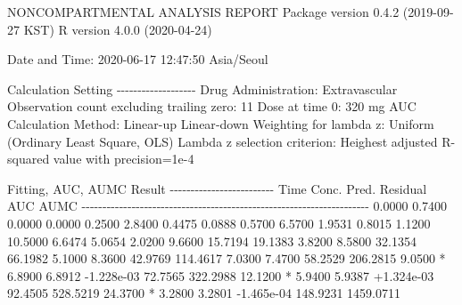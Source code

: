 \documentclass[
  12pt,
]{krantz}
\newenvironment{Shaded}{\begin{snugshade}}{\end{snugshade}}
\newcommand{\ExtensionTok}[1]{#1}
\newcommand{\NormalTok}[1]{#1}
\begin{document}
\begin{Shaded}
\begin{Highlighting}[]
                        \ExtensionTok{NONCOMPARTMENTAL}\NormalTok{ ANALYSIS REPORT}
                       \ExtensionTok{Package}\NormalTok{ version 0.4.2 (2019{-}09{-}27 KST)}
                          \ExtensionTok{R}\NormalTok{ version 4.0.0 (2020{-}04{-}24)}

\ExtensionTok{Date}\NormalTok{ and Time: 2020{-}06{-}17 12:47:50 Asia/Seoul}

\ExtensionTok{Calculation}\NormalTok{ Setting}
\ExtensionTok{{-}{-}{-}{-}{-}{-}{-}{-}{-}{-}{-}{-}{-}{-}{-}{-}{-}{-}{-}}
\ExtensionTok{Drug}\NormalTok{ Administration: Extravascular}
\ExtensionTok{Observation}\NormalTok{ count excluding trailing zero: 11}
\ExtensionTok{Dose}\NormalTok{ at time 0: 320 mg}
\ExtensionTok{AUC}\NormalTok{ Calculation Method: Linear{-}up Linear{-}down}
\ExtensionTok{Weighting}\NormalTok{ for lambda z: Uniform (Ordinary Least Square, OLS)}
\ExtensionTok{Lambda}\NormalTok{ z selection criterion: Heighest adjusted R{-}squared value with precision=1e{-}4}


\ExtensionTok{Fitting}\NormalTok{, AUC, AUMC Result}
\ExtensionTok{{-}{-}{-}{-}{-}{-}{-}{-}{-}{-}{-}{-}{-}{-}{-}{-}{-}{-}{-}{-}{-}{-}{-}{-}{-}}
      \ExtensionTok{Time}\NormalTok{         Conc.      Pred.   Residual       AUC       AUMC}
\ExtensionTok{{-}{-}{-}{-}{-}{-}{-}{-}{-}{-}{-}{-}{-}{-}{-}{-}{-}{-}{-}{-}{-}{-}{-}{-}{-}{-}{-}{-}{-}{-}{-}{-}{-}{-}{-}{-}{-}{-}{-}{-}{-}{-}{-}{-}{-}{-}{-}{-}{-}{-}{-}{-}{-}{-}{-}{-}{-}{-}{-}{-}{-}{-}{-}{-}{-}{-}{-}{-}{-}}
     \ExtensionTok{0.0000}\NormalTok{       0.7400                           0.0000     0.0000}
     \ExtensionTok{0.2500}\NormalTok{       2.8400                           0.4475     0.0888}
     \ExtensionTok{0.5700}\NormalTok{       6.5700                           1.9531     0.8015}
     \ExtensionTok{1.1200}\NormalTok{      10.5000                           6.6474     5.0654}
     \ExtensionTok{2.0200}\NormalTok{       9.6600                          15.7194    19.1383}
     \ExtensionTok{3.8200}\NormalTok{       8.5800                          32.1354    66.1982}
     \ExtensionTok{5.1000}\NormalTok{       8.3600                          42.9769   114.4617}
     \ExtensionTok{7.0300}\NormalTok{       7.4700                          58.2529   206.2815}
     \ExtensionTok{9.0500}\NormalTok{ *     6.8900     6.8912 {-}1.228e{-}03    72.7565   322.2988}
    \ExtensionTok{12.1200}\NormalTok{ *     5.9400     5.9387 +1.324e{-}03    92.4505   528.5219}
    \ExtensionTok{24.3700}\NormalTok{ *     3.2800     3.2801 {-}1.465e{-}04   148.9231  1459.0711}


\end{Highlighting}
\end{Shaded}
\end{document}
